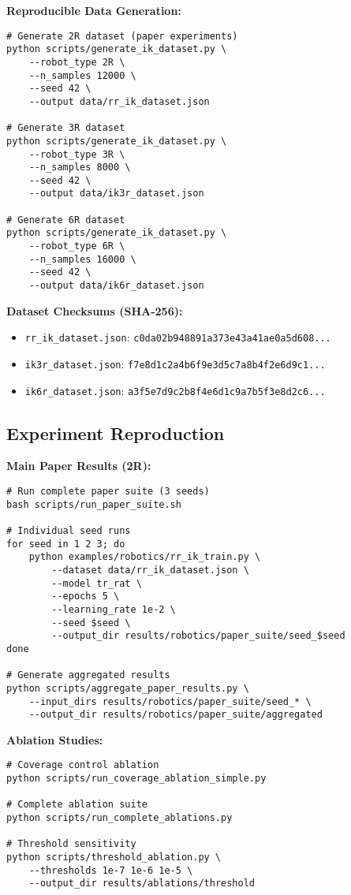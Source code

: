 \documentclass[twoside,11pt]{article}
\begin{document}
\textbf{Reproducible Data Generation:}
\begin{verbatim}
# Generate 2R dataset (paper experiments)
python scripts/generate_ik_dataset.py \
    --robot_type 2R \
    --n_samples 12000 \
    --seed 42 \
    --output data/rr_ik_dataset.json

# Generate 3R dataset
python scripts/generate_ik_dataset.py \
    --robot_type 3R \
    --n_samples 8000 \
    --seed 42 \
    --output data/ik3r_dataset.json

# Generate 6R dataset
python scripts/generate_ik_dataset.py \
    --robot_type 6R \
    --n_samples 16000 \
    --seed 42 \
    --output data/ik6r_dataset.json
\end{verbatim}

\textbf{Dataset Checksums (SHA-256):}
\begin{itemize}
\item \texttt{rr\_ik\_dataset.json}: \texttt{c0da02b948891a373e43a41ae0a5d608...}
\item \texttt{ik3r\_dataset.json}: \texttt{f7e8d1c2a4b6f9e3d5c7a8b4f2e6d9c1...}
\item \texttt{ik6r\_dataset.json}: \texttt{a3f5e7d9c2b8f4e6d1c9a7b5f3e8d2c6...}
\end{itemize}

\subsection{Experiment Reproduction}

\textbf{Main Paper Results (2R):}
\begin{verbatim}
# Run complete paper suite (3 seeds)
bash scripts/run_paper_suite.sh

# Individual seed runs
for seed in 1 2 3; do
    python examples/robotics/rr_ik_train.py \
        --dataset data/rr_ik_dataset.json \
        --model tr_rat \
        --epochs 5 \
        --learning_rate 1e-2 \
        --seed $seed \
        --output_dir results/robotics/paper_suite/seed_$seed
done

# Generate aggregated results
python scripts/aggregate_paper_results.py \
    --input_dirs results/robotics/paper_suite/seed_* \
    --output_dir results/robotics/paper_suite/aggregated
\end{verbatim}

\textbf{Ablation Studies:}
\begin{verbatim}
# Coverage control ablation
python scripts/run_coverage_ablation_simple.py

# Complete ablation suite
python scripts/run_complete_ablations.py

# Threshold sensitivity
python scripts/threshold_ablation.py \
    --thresholds 1e-7 1e-6 1e-5 \
    --output_dir results/ablations/threshold
\end{verbatim}
\end{document}
